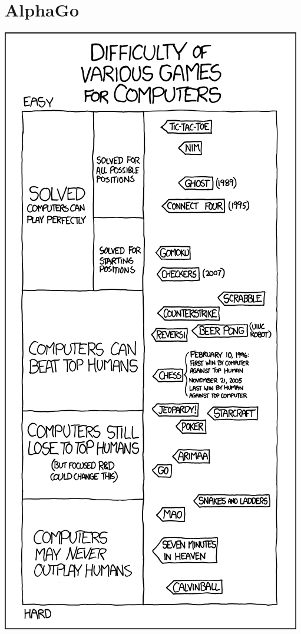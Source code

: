 \documentclass{beamer}
\begin{document}
\section{AlphaGo}


\begin{frame}
  \begin{center}
    \includegraphics[height=\textheight]{gameais}
  \end{center}
\end{frame}
\end{document}
